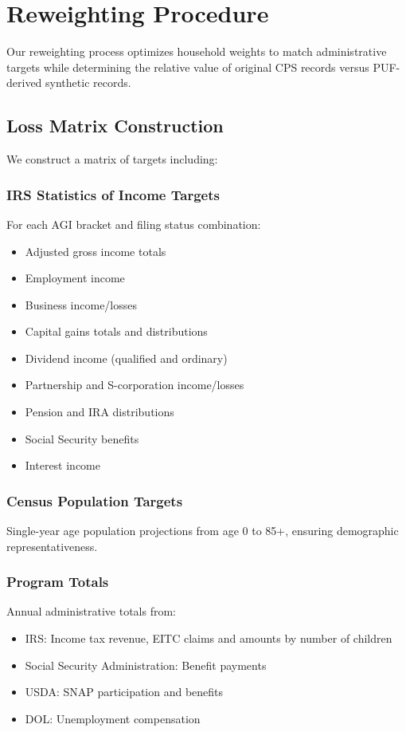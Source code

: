 \section{Reweighting Procedure}

Our reweighting process optimizes household weights to match administrative targets while determining the relative value of original CPS records versus PUF-derived synthetic records.

\subsection{Loss Matrix Construction}

We construct a matrix of targets including:

\subsubsection{IRS Statistics of Income Targets}
For each AGI bracket and filing status combination:
\begin{itemize}
    \item Adjusted gross income totals
    \item Employment income
    \item Business income/losses
    \item Capital gains totals and distributions
    \item Dividend income (qualified and ordinary)
    \item Partnership and S-corporation income/losses
    \item Pension and IRA distributions
    \item Social Security benefits
    \item Interest income
\end{itemize}

\subsubsection{Census Population Targets}
Single-year age population projections from age 0 to 85+, ensuring demographic representativeness.

\subsubsection{Program Totals}
Annual administrative totals from:
\begin{itemize}
    \item IRS: Income tax revenue, EITC claims and amounts by number of children
    \item Social Security Administration: Benefit payments
    \item USDA: SNAP participation and benefits
    \item DOL: Unemployment compensation
\end{itemize}

